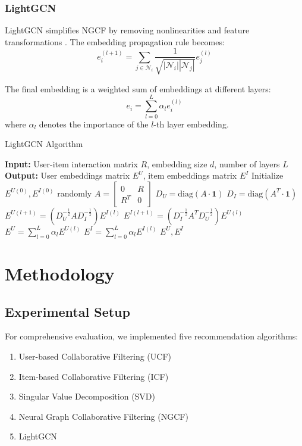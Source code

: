 \documentclass[sigconf,nonacm]{acmart} %
\begin{document}
\subsubsection{LightGCN}
LightGCN simplifies NGCF by removing nonlinearities and feature transformations \cite{he2020lightgcn}. The embedding propagation rule becomes:
\begin{equation}
e_i^{(l+1)} = \sum_{j\in\mathcal{N}_i} \frac{1}{\sqrt{|\mathcal{N}_i||\mathcal{N}_j|}}e_j^{(l)}
\label{eq:lightgcn}
\end{equation}

The final embedding is a weighted sum of embeddings at different layers:
\begin{equation}
e_i = \sum_{l=0}^{L} \alpha_l e_i^{(l)}
\label{eq:lightgcn_final}
\end{equation}
where $\alpha_l$ denotes the importance of the $l$-th layer embedding.

\begin{algorithm}[ht]
\caption{LightGCN Algorithm}
\label{alg:lightgcn}
\begin{algorithmic}
\STATE \textbf{Input:} User-item interaction matrix $R$, embedding size $d$, number of layers $L$
\STATE \textbf{Output:} User embeddings matrix $E^U$, item embeddings matrix $E^I$
\STATE Initialize $E^{U(0)}, E^{I(0)}$ randomly
\STATE $A = \begin{bmatrix} 0 & R \\ R^T & 0 \end{bmatrix}$ \quad
\STATE $D_U = \text{diag}(A \cdot \mathbf{1})$ \quad 
\STATE $D_I = \text{diag}(A^T \cdot \mathbf{1})$ \quad  
{}
    \STATE $E^{U(l+1)} = (D_U^{-\frac{1}{2}}AD_I^{-\frac{1}{2}})E^{I(l)}$
    \STATE $E^{I(l+1)} = (D_I^{-\frac{1}{2}}A^TD_U^{-\frac{1}{2}})E^{U(l)}$
\ENDFOR
\STATE $E^U = \sum_{l=0}^{L}\alpha_l E^{U(l)}$
\STATE $E^I = \sum_{l=0}^{L}\alpha_l E^{I(l)}$
\RETURN $E^U, E^I$


\end{algorithmic}
\end{algorithm}

  
\section{Methodology}
\subsection{Experimental Setup}
For comprehensive evaluation, we implemented five recommendation algorithms:
\begin{enumerate}
    \item User-based Collaborative Filtering (UCF)
    \item Item-based Collaborative Filtering (ICF)
    \item Singular Value Decomposition (SVD)
    \item Neural Graph Collaborative Filtering (NGCF)
    \item LightGCN
\end{enumerate}
\end{document}
